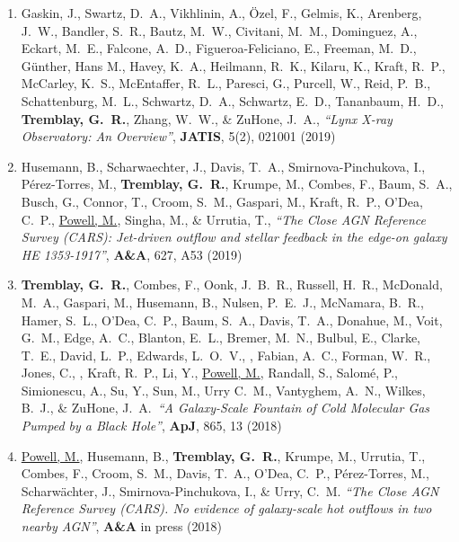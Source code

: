 \documentclass[11pt]{article}
\begin{document}
\vspace{-4mm}

\begin{enumerate}%


\item Gaskin, J., Swartz, D.~A., Vikhlinin, A., \"{O}zel, F.,
Gelmis, K., Arenberg, J.~W., Bandler, S.~R., Bautz, M.~W., Civitani, M.~M.,
Dominguez, A., Eckart, M.~E., Falcone, A.~D., Figueroa-Feliciano, E.,
Freeman, M.~D., G\"{u}nther, Hans M., Havey, K.~A., Heilmann, R.~K.,
Kilaru, K., Kraft, R.~P., McCarley, K.~S., McEntaffer, R.~L.,
Paresci, G., Purcell, W., Reid, P.~B., Schattenburg, M.~L.,
Schwartz, D.~A., Schwartz, E.~D., Tananbaum, H.~D.,
\textbf{Tremblay, G.~R.}, Zhang, W.~W., \& ZuHone, J.~A.,
\textit{``Lynx X-ray Observatory: An Overview''}, \textbf{JATIS}, 5(2), 021001 (2019)

\item Husemann, B., Scharwaechter, J., Davis, T.~A., Smirnova-Pinchukova, I., P\'{e}rez-Torres, M., \textbf{Tremblay, G.~R.},
 Krumpe, M., Combes, F., Baum, S.~A., Busch, G., Connor, T.,
 Croom, S.~M., Gaspari, M., Kraft, R.~P., O'Dea, C.~P., \uline{Powell, M.}, Singha, M., \& Urrutia, T., \textit{``The Close AGN Reference Survey (CARS): Jet-driven outflow and stellar feedback in the edge-on galaxy HE 1353-1917''}, \textbf{A\&A}, 627, A53 (2019)

\item \textbf{Tremblay, G.~R.}, Combes, F., Oonk, J.~B.~R., Russell, H.~R., McDonald, M.~A.,
Gaspari, M., Husemann, B., Nulsen, P.~E.~J., McNamara, B.~R., Hamer, S.~L., O'Dea, C.~P.,
Baum, S.~A., Davis, T.~A., Donahue, M., Voit, G.~M., Edge, A.~C., Blanton, E.~L.,
Bremer, M.~N., Bulbul, E., Clarke, T.~E., David, L.~P., Edwards, L.~O.~V., , Fabian, A.~C., Forman, W.~R., Jones, C., , Kraft, R.~P., Li, Y., \uline{Powell, M.},
Randall, S., Salom\'{e}, P., Simionescu, A., Su, Y., Sun, M., Urry C.~M., Vantyghem, A.~N.,
Wilkes, B.~J., \& ZuHone, J.~A.~\textit{``A Galaxy-Scale Fountain of Cold Molecular Gas Pumped by a Black Hole''}, \textbf{ApJ}, 865, 13 (2018)



\item \uline{Powell, M.}, Husemann, B., \textbf{Tremblay, G.~R.}, Krumpe, M.,
Urrutia, T., Combes, F., Croom, S.~M., Davis, T.~A., O'Dea, C.~P., P\'{e}rez-Torres,
M., Scharw\"{a}chter, J., Smirnova-Pinchukova, I., \& Urry, C.~M. \textit{``The Close AGN Reference Survey (CARS). No evidence of galaxy-scale hot outflows in two nearby AGN''}, \textbf{A\&A} in press (2018)



\end{enumerate}
\end{document}
